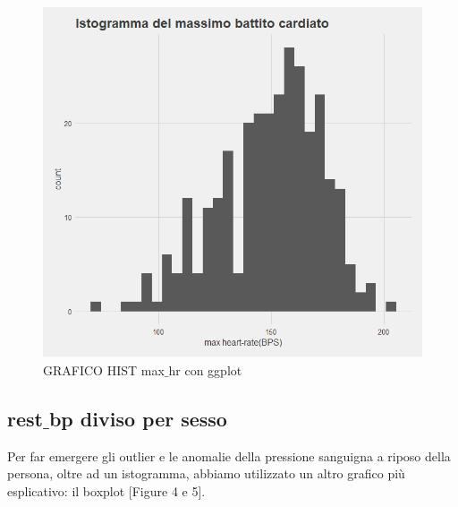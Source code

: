 \documentclass{article}
\begin{document}
\begin{figure}[h]
	\centering
	\includegraphics[width=1\textwidth]{max_hr_after.png}
	\caption{GRAFICO HIST max$\_$hr con ggplot}
	\label {fig:ds1}
\end{figure}

\newpage
\subsection { rest$\_$bp diviso per sesso }
Per far emergere gli outlier e le anomalie della pressione sanguigna a riposo della persona, oltre ad un istogramma, abbiamo utilizzato un altro grafico più esplicativo: il boxplot [Figure 4 e 5].
\end{document}
